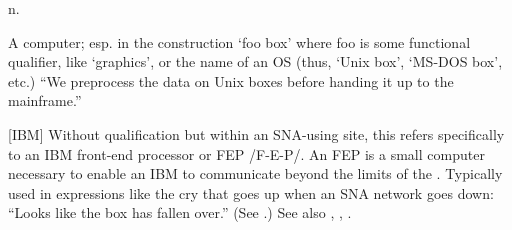  n.

\begin{inparaenum}
\item A computer; esp. in the construction `foo box' where foo is some
    functional qualifier, like `graphics', or the name of an OS (thus, `Unix
    box', `MS-DOS box', etc.) ``We preprocess the data on Unix boxes before
    handing it up to the mainframe.'' 
\item {[}IBM] Without qualification but within an SNA-using site, this refers
    specifically to an IBM front-end processor or FEP /F-E-P/. An FEP is a small
    computer necessary to enable an IBM  to communicate
    beyond the limits of the . Typically used in
    expressions like the cry that goes up when an SNA network goes down: ``Looks
    like the box has fallen over.'' (See .) See also
    , , .
\end{inparaenum}

